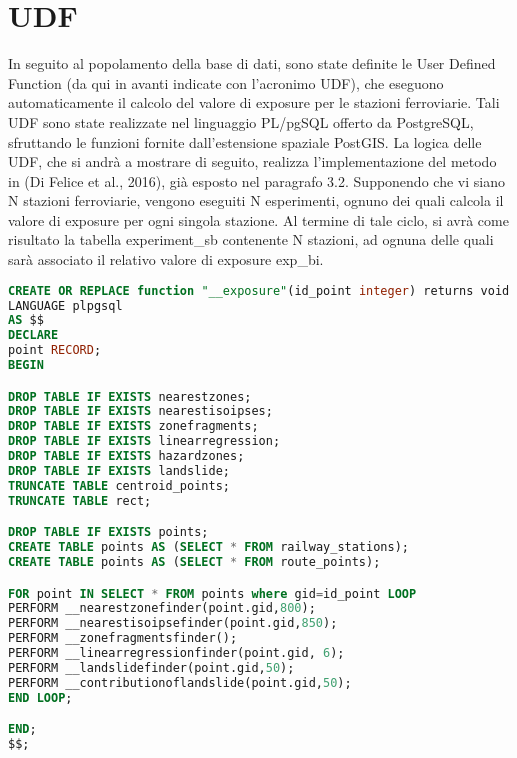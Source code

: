 
\chapter{UDF}

In seguito al popolamento della base di dati, sono state definite le User Defined Function (da qui in
avanti indicate con l’acronimo UDF), che eseguono automaticamente il calcolo del valore di
exposure per le stazioni ferroviarie. Tali UDF sono state realizzate nel linguaggio PL/pgSQL offerto
da PostgreSQL, sfruttando le funzioni fornite dall’estensione spaziale PostGIS. La logica delle
UDF, che si andrà a mostrare di seguito, realizza l’implementazione del metodo in (Di Felice et al.,
2016), già esposto nel paragrafo 3.2. Supponendo che vi siano N stazioni ferroviarie, vengono
eseguiti N esperimenti, ognuno dei quali calcola il valore di exposure per ogni singola stazione. Al
termine di tale ciclo, si avrà come risultato la tabella experiment_sb contenente N stazioni, ad
ognuna delle quali sarà associato il relativo valore di exposure exp_bi. 



\lstset{style=mystyle}


\begin{lstlisting}[language=SQL]
CREATE OR REPLACE function "__exposure"(id_point integer) returns void
LANGUAGE plpgsql
AS $$
DECLARE
point RECORD;
BEGIN

DROP TABLE IF EXISTS nearestzones;
DROP TABLE IF EXISTS nearestisoipses;
DROP TABLE IF EXISTS zonefragments;
DROP TABLE IF EXISTS linearregression;
DROP TABLE IF EXISTS hazardzones;
DROP TABLE IF EXISTS landslide;
TRUNCATE TABLE centroid_points;
TRUNCATE TABLE rect;

DROP TABLE IF EXISTS points;
CREATE TABLE points AS (SELECT * FROM railway_stations);
CREATE TABLE points AS (SELECT * FROM route_points);

FOR point IN SELECT * FROM points where gid=id_point LOOP
PERFORM __nearestzonefinder(point.gid,800);
PERFORM __nearestisoipsefinder(point.gid,850);
PERFORM __zonefragmentsfinder();
PERFORM __linearregressionfinder(point.gid, 6);
PERFORM __landslidefinder(point.gid,50);
PERFORM __contributionoflandslide(point.gid,50);
END LOOP;

END;
$$;
\end{lstlisting}


